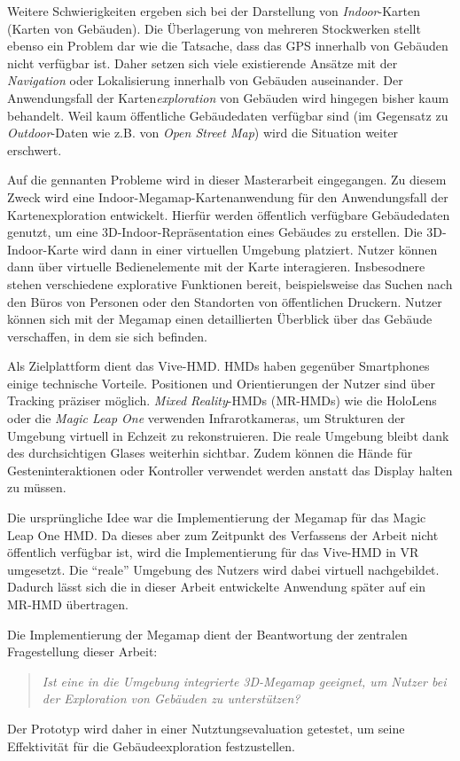 Weitere Schwierigkeiten ergeben sich bei der Darstellung von \emph{Indoor}-Karten (Karten von Gebäuden).
Die Überlagerung von mehreren Stockwerken stellt ebenso ein Problem dar wie die Tatsache, dass das GPS innerhalb von Gebäuden nicht verfügbar ist.
Daher setzen sich viele existierende Ansätze mit der \emph{Navigation} oder Lokalisierung innerhalb von Gebäuden auseinander.
Der Anwendungsfall der Karten\emph{exploration} von Gebäuden wird hingegen bisher kaum behandelt.
Weil kaum öffentliche Gebäudedaten verfügbar sind (im Gegensatz zu \emph{Outdoor}-Daten wie z.B. von \emph{Open Street Map}) wird die Situation weiter erschwert.

Auf die gennanten Probleme wird in dieser Masterarbeit eingegangen.
Zu diesem Zweck wird eine Indoor-Megamap-Kartenanwendung für den Anwendungsfall der Kartenexploration entwickelt.
Hierfür werden öffentlich verfügbare Gebäudedaten genutzt, um eine 3D-Indoor-Repräsentation eines Gebäudes zu erstellen.
Die 3D-Indoor-Karte wird dann in einer virtuellen Umgebung platziert.
Nutzer können dann über virtuelle Bedienelemente mit der Karte interagieren.
Insbesodnere stehen verschiedene explorative Funktionen bereit, beispielsweise das Suchen nach den Büros von Personen oder den Standorten von öffentlichen Druckern.
Nutzer können sich mit der Megamap einen detaillierten Überblick über das Gebäude verschaffen, in dem sie sich befinden.

Als Zielplattform dient das Vive-HMD.
HMDs haben gegenüber Smartphones einige technische Vorteile.
Positionen und Orientierungen der Nutzer sind über Tracking präziser möglich.
\emph{Mixed Reality}-HMDs (MR-HMDs) wie die HoloLens oder die \emph{Magic Leap One} \parencite{MagicLeap2018} verwenden Infrarotkameras, um Strukturen der Umgebung virtuell in Echzeit zu rekonstruieren.
Die reale Umgebung bleibt dank des durchsichtigen Glases weiterhin sichtbar.
Zudem können die Hände für Gesteninteraktionen oder Kontroller verwendet werden anstatt das Display halten zu müssen.

Die ursprüngliche Idee war die Implementierung der Megamap für das Magic Leap One HMD.
Da dieses aber zum Zeitpunkt des Verfassens der Arbeit nicht öffentlich verfügbar ist, wird die Implementierung für das Vive-HMD in VR umgesetzt.
Die \enquote{reale} Umgebung des Nutzers wird dabei virtuell nachgebildet.
Dadurch lässt sich die in dieser Arbeit entwickelte Anwendung später auf ein MR-HMD übertragen.

Die Implementierung der Megamap dient der Beantwortung der zentralen Fragestellung dieser Arbeit:
\begin{quote}
    \itshape
    Ist eine in die Umgebung integrierte 3D-Megamap geeignet, um Nutzer bei der Exploration von Gebäuden zu unterstützen?
\end{quote}
Der Prototyp wird daher in einer Nutztungsevaluation getestet, um seine Effektivität für die Gebäudeexploration festzustellen.

